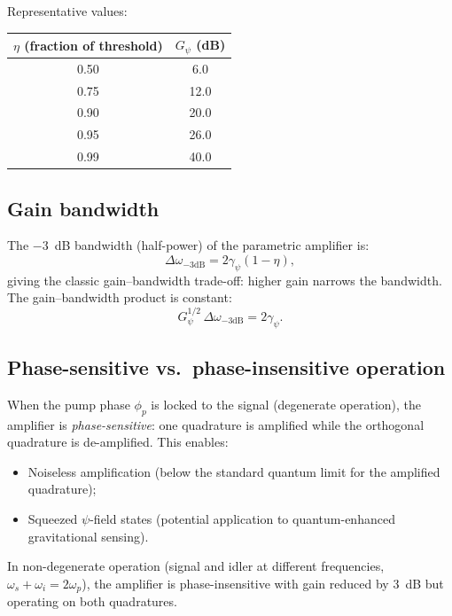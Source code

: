 \documentclass[12pt,aps,prd,twocolumn,superscriptaddress,nofootinbib]{revtex4-2}
\newcommand{\gpsi}{\gamma_\psi}
\begin{document}
Representative values:
\begin{center}
\begin{tabular}{cc}
\toprule
$\eta$ (fraction of threshold) & $G_\psi$ (dB) \\
\midrule
0.50 & 6.0 \\
0.75 & 12.0 \\
0.90 & 20.0 \\
0.95 & 26.0 \\
0.99 & 40.0 \\
\bottomrule
\end{tabular}
\end{center}

\subsection{Gain bandwidth}

The $-3$~dB bandwidth (half-power) of the parametric amplifier is:
\begin{equation}
  \Delta\omega_{-3\mathrm{dB}} = 2\gpsi(1 - \eta),
  \label{eq:bandwidth}
\end{equation}
giving the classic gain--bandwidth trade-off: higher gain narrows the
bandwidth.  The gain--bandwidth product is constant:
\begin{equation}
  G_\psi^{1/2}\,\Delta\omega_{-3\mathrm{dB}} = 2\gpsi.
  \label{eq:GBW}
\end{equation}

\subsection{Phase-sensitive vs.\ phase-insensitive operation}

When the pump phase $\phi_p$ is locked to the signal (degenerate
operation), the amplifier is \emph{phase-sensitive}: one quadrature is
amplified while the orthogonal quadrature is de-amplified.  This enables:
\begin{itemize}[noitemsep]
  \item Noiseless amplification (below the standard quantum limit for
    the amplified quadrature);
  \item Squeezed $\psi$-field states (potential application to
    quantum-enhanced gravitational sensing).
\end{itemize}

In non-degenerate operation (signal and idler at different frequencies,
$\omega_s + \omega_i = 2\omega_p$), the amplifier is phase-insensitive
with gain reduced by 3~dB but operating on both quadratures.
\end{document}
